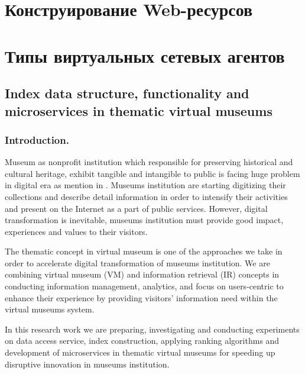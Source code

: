 \section{Конструирование Web-ресурсов}\label{sec:ch4/sect1}

\section{Типы виртуальных сетевых агентов}\label{sec:ch4/sect2}

\subsection{Index data structure, functionality and microservices in thematic virtual museums}\label{subsec:ch4/sec2/sub1}

\subsubsection{Introduction.} Museum as nonprofit institution which responsible for preserving historical and cultural heritage, exhibit tangible and intangible to public is facing huge problem in digital era as mention in \cite{AnggaiBlekanovSergeev2014}. Museums institution are starting digitizing their collections and describe detail information in order to intensify their activities and present on the Internet as a part of public services. However, digital transformation is inevitable, museums institution must provide good impact, experiences and values to their visitors.

The thematic concept in virtual museum is one of the approaches we take in order to accelerate digital transformation of museums institution. We are combining virtual museum (VM) and information retrieval (IR) concepts in conducting information management, analytics, and focus on users-centric to enhance their experience by providing visitors’ information need within the virtual museums system.

In this research work we are preparing, investigating and conducting experiments on data access service, index construction, applying ranking algorithms and development of microservices in thematic virtual museums for speeding up disruptive innovation in museums institution.

